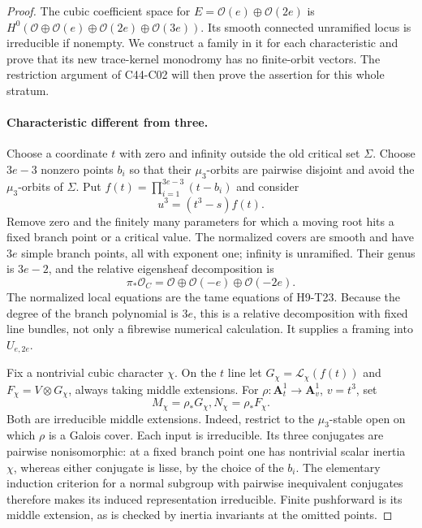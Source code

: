\begin{proof}
The cubic coefficient space for $E=\mathcal O(e)\oplus\mathcal O(2e)$
is $H^0(\mathcal O\oplus\mathcal O(e)\oplus\mathcal O(2e)
\oplus\mathcal O(3e))$. Its smooth connected unramified locus is
irreducible if nonempty. We construct a family in it for each
characteristic and prove that its new trace-kernel monodromy has
no finite-orbit vectors. The restriction argument of C44-C02
will then prove the assertion for this whole stratum.

\paragraph{Characteristic different from three.}
Choose a coordinate $t$ with zero and infinity outside the old critical
set $\Sigma$. Choose $3e-3$ nonzero points $b_i$ so that their
$\mu_3$-orbits are pairwise disjoint and avoid the $\mu_3$-orbits of
$\Sigma$. Put $f(t)=\prod_{i=1}^{3e-3}(t-b_i)$ and consider
\[
                   u^3=(t^3-s)f(t).
 \tag{C44.C04.1}
\]
Remove zero and the finitely many parameters for which a moving root
hits a fixed branch point or a critical value. The normalized covers
are smooth and have $3e$ simple branch points, all with exponent one;
infinity is unramified. Their genus is $3e-2$, and the relative
eigensheaf decomposition is
\[
        \pi_*\mathcal O_C=
        \mathcal O\oplus\mathcal O(-e)\oplus\mathcal O(-2e).
 \tag{C44.C04.2}
\]
The normalized local equations are the tame equations of H9-T23.
Because the degree of the branch polynomial is $3e$, this is a
relative decomposition with fixed line bundles, not only a
fibrewise numerical calculation. It supplies a framing into $U_{e,2e}$.

Fix a nontrivial cubic character $\chi$. On the $t$ line let
$G_\chi=\mathcal L_\chi(f(t))$ and
$F_\chi=V\otimes G_\chi$, always taking middle extensions.
For $\rho:\mathbf A^1_t\to\mathbf A^1_v$, $v=t^3$, set
\[
                  M_\chi=\rho_*G_\chi,
                  N_\chi=\rho_*F_\chi.
\]
Both are irreducible middle extensions. Indeed, restrict to the
$\mu_3$-stable open on which $\rho$ is a Galois cover. Each input
is irreducible. Its three conjugates are pairwise nonisomorphic:
at a fixed branch point one has nontrivial scalar inertia $\chi$,
whereas either conjugate is lisse, by the choice of the $b_i$.
The elementary induction criterion for a normal subgroup with
pairwise inequivalent conjugates therefore makes its induced
representation irreducible. Finite pushforward is its middle
extension, as is checked by inertia invariants at the omitted points.


\end{proof}
